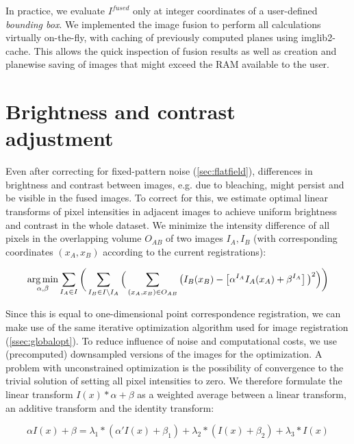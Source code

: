 In practice, we evaluate $I^{fused}$ only at integer coordinates of a user-defined \emph{bounding box}. We implemented the image fusion to perform all calculations virtually on-the-fly, with caching of previously computed planes using imglib2-cache. This allows the quick inspection of fusion results as well as creation and planewise saving of images that might exceed the RAM available to the user.

\section{Brightness and contrast adjustment}
\label{sec:brightness-adjust}

Even after correcting for fixed-pattern noise (\ref{sec:flatfield}), differences in brightness and contrast between images, e.g. due to bleaching, might persist and be visible in the fused images. To correct for this, we estimate optimal linear transforms of pixel intensities in adjacent images \cite{blasse2017premosa} to achieve uniform brightness and contrast in the whole dataset. We minimize the intensity difference of all pixels in the overlapping volume $O_{AB}$ of two images $I_A, I_B$ (with corresponding coordinates $(x_A, x_B)$ according to the current registrations): 

\begin{equation}
\label{eq:brighness-adjust-1}
\operatorname*{arg\,min}_{\alpha, \beta} \sum_{I_A  \in I}  \bigg( \sum_{I_B \in I \setminus I_A} \Big( \sum_{(x_A, x_B) \in O_{AB}} \big( I_B(x_B) - \left[ \alpha^{I_A} I_A(x_A) + \beta^{I_A} \right] \big)^2 \Big)\bigg)
\end{equation}

Since this is equal to one-dimensional point correspondence registration, we can make use of the same iterative optimization algorithm used for image registration (\ref{ssec:globalopt}). To reduce influence of noise and computational costs, we use (precomputed) downsampled versions of the images for the optimization. A problem with unconstrained optimization is the possibility of convergence to the trivial solution of setting all pixel intensities to zero. We therefore formulate the linear transform $I(x)*\alpha + \beta$ as a weighted average between a linear transform, an additive transform and the identity transform:

\begin{equation}
\label{eq:brighness-adjust-2}
\alpha I(x) + \beta = \lambda_1 * (\alpha' I(x) + \beta_1) + \lambda_2 * (I(x) + \beta_2) + \lambda_3 * I(x) 
\end{equation}


